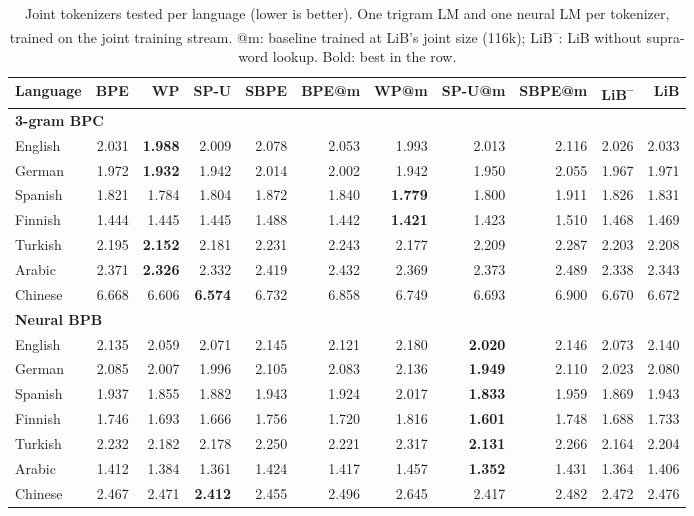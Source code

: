 \documentclass[pdflatex,sn-apa]{sn-jnl}
\begin{document}
\begin{table}[t]
\centering
\footnotesize
\setlength{\tabcolsep}{2.6pt}
\begin{tabular}{lrrrrrrrrrr}
\toprule
\textbf{Language} & \textbf{BPE} & \textbf{WP} & \textbf{SP-U} & \textbf{SBPE}
& \textbf{BPE@m} & \textbf{WP@m} & \textbf{SP-U@m} & \textbf{SBPE@m}
& \textbf{LiB\textsuperscript{--}} & \textbf{LiB} \\
\midrule
\multicolumn{11}{l}{\textbf{3-gram BPC}} \\
English  & 2.031 & \textbf{1.988} & 2.009 & 2.078 & 2.053 & 1.993 & 2.013 & 2.116 & 2.026 & 2.033 \\
German   & 1.972 & \textbf{1.932} & 1.942 & 2.014 & 2.002 & 1.942 & 1.950 & 2.055 & 1.967 & 1.971 \\
Spanish  & 1.821 & 1.784 & 1.804 & 1.872 & 1.840 & \textbf{1.779} & 1.800 & 1.911 & 1.826 & 1.831 \\
Finnish  & 1.444 & 1.445 & 1.445 & 1.488 & 1.442 & \textbf{1.421} & 1.423 & 1.510 & 1.468 & 1.469 \\
Turkish  & 2.195 & \textbf{2.152} & 2.181 & 2.231 & 2.243 & 2.177 & 2.209 & 2.287 & 2.203 & 2.208 \\
Arabic   & 2.371 & \textbf{2.326} & 2.332 & 2.419 & 2.432 & 2.369 & 2.373 & 2.489 & 2.338 & 2.343 \\
Chinese  & 6.668 & 6.606 & \textbf{6.574} & 6.732 & 6.858 & 6.749 & 6.693 & 6.900 & 6.670 & 6.672 \\
\midrule
\multicolumn{11}{l}{\textbf{Neural BPB}} \\
English  & 2.135 & 2.059 & 2.071 & 2.145 & 2.121 & 2.180 & \textbf{2.020} & 2.146 & 2.073 & 2.140 \\
German   & 2.085 & 2.007 & 1.996 & 2.105 & 2.083 & 2.136 & \textbf{1.949} & 2.110 & 2.023 & 2.080 \\
Spanish  & 1.937 & 1.855 & 1.882 & 1.943 & 1.924 & 2.017 & \textbf{1.833} & 1.959 & 1.869 & 1.943 \\
Finnish  & 1.746 & 1.693 & 1.666 & 1.756 & 1.720 & 1.816 & \textbf{1.601} & 1.748 & 1.688 & 1.733 \\
Turkish  & 2.232 & 2.182 & 2.178 & 2.250 & 2.221 & 2.317 & \textbf{2.131} & 2.266 & 2.164 & 2.204 \\
Arabic   & 1.412 & 1.384 & 1.361 & 1.424 & 1.417 & 1.457 & \textbf{1.352} & 1.431 & 1.364 & 1.406 \\
Chinese  & 2.467 & 2.471 & \textbf{2.412} & 2.455 & 2.496 & 2.645 & 2.417 & 2.482 & 2.472 & 2.476 \\
\bottomrule
\end{tabular}
\caption{Joint tokenizers tested per language (lower is better). One trigram
LM and one neural LM per tokenizer, trained on the joint training stream.
@m: baseline trained at LiB's joint size (116k); LiB\textsuperscript{--}:
LiB without supra-word lookup. Bold: best in the row.}
\label{tab:joint_lm}
\end{table}
\end{document}
